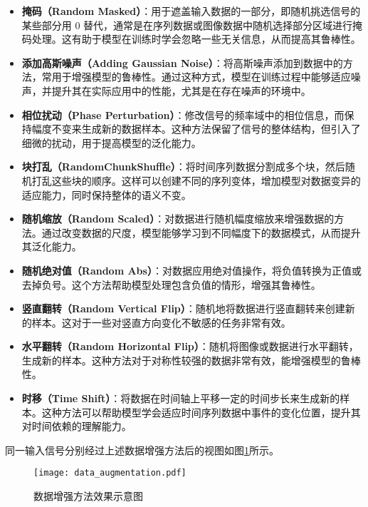 \documentclass[master]{thesis-uestc}
\begin{document}
\begin{itemize}
    \item \textbf{掩码（Random Masked）}：用于遮盖输入数据的一部分，即随机挑选信号的某些部分用 0 替代，通常是在序列数据或图像数据中随机选择部分区域进行掩码处理。这有助于模型在训练时学会忽略一些无关信息，从而提高其鲁棒性。

    \item \textbf{添加高斯噪声（Adding Gaussian Noise）}：将高斯噪声添加到数据中的方法，常用于增强模型的鲁棒性。通过这种方式，模型在训练过程中能够适应噪声，并提升其在实际应用中的性能，尤其是在存在噪声的环境中。

    \item \textbf{相位扰动（Phase Perturbation）}：修改信号的频率域中的相位信息，而保持幅度不变来生成新的数据样本。这种方法保留了信号的整体结构，但引入了细微的扰动，用于提高模型的泛化能力。

    \item \textbf{块打乱（RandomChunkShuffle）}：将时间序列数据分割成多个块，然后随机打乱这些块的顺序。这样可以创建不同的序列变体，增加模型对数据变异的适应能力，同时保持整体的语义不变。

    \item \textbf{随机缩放（Random Scaled）}：对数据进行随机幅度缩放来增强数据的方法。通过改变数据的尺度，模型能够学习到不同幅度下的数据模式，从而提升其泛化能力。

    \item \textbf{随机绝对值（Random Abs）}：对数据应用绝对值操作，将负值转换为正值或去掉负号。这个方法帮助模型处理包含负值的情形，增强其鲁棒性。

    \item \textbf{竖直翻转（Random Vertical Flip）}：随机地将数据进行竖直翻转来创建新的样本。这对于一些对竖直方向变化不敏感的任务非常有效。

    \item \textbf{水平翻转（Random Horizontal Flip）}：随机将图像或数据进行水平翻转，生成新的样本。这种方法对于对称性较强的数据非常有效，能增强模型的鲁棒性。

    \item \textbf{时移（Time Shift）}：将数据在时间轴上平移一定的时间步长来生成新的样本。这种方法可以帮助模型学会适应时间序列数据中事件的变化位置，提升其对时间依赖的理解能力。
\end{itemize}
同一输入信号分别经过上述数据增强方法后的视图如图\ref{data_augmentation}所示。
\begin{figure}[h]
    \centering
    \texttt{[image: data\_augmentation.pdf]}
    \caption{数据增强方法效果示意图}
    \label{data_augmentation}
\end{figure}
\end{document}
